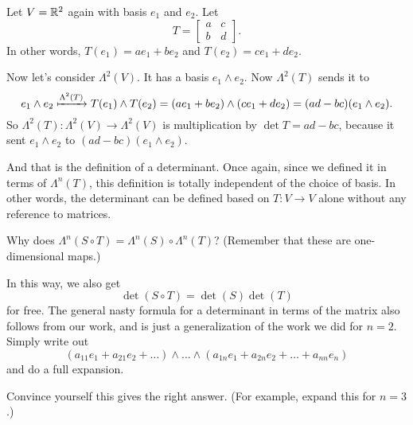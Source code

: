 \begin{example}
	Let $V = \mathbb R^2$ again with basis $e_1$ and $e_2$.
	Let
	\[ T = \begin{bmatrix}
			a & c \\ b & d
		\end{bmatrix}.
	\]
	In other words, $T(e_1) = ae_1 + be_2$ and $T(e_2) = ce_1 + de_2$.

	Now let's consider $\Lambda^2(V)$.
	It has a basis $e_1 \wedge e_2$.
	Now $\Lambda^2(T)$ sends it to
	\[ e_1 \wedge e_2 \xmapsto{\Lambda^2(T)} T(e_1) \wedge T(e_2) =
		(ae_1 + be_2) \wedge (ce_1 + de_2) 
		= (ad-bc)(e_1 \wedge e_2). 
	\]
	So $\Lambda^2(T) : \Lambda^2(V) \to \Lambda^2(V)$
	is multiplication by $\det T = ad-bc$,
	because it sent $e_1 \wedge e_2$ to $(ad-bc)(e_1 \wedge e_2)$.
\end{example}
And that is the definition of a determinant.
Once again, since we defined it in terms of $\Lambda^n(T)$,
this definition is totally independent of the choice of basis.
In other words, the determinant can be defined based on $T : V \to V$ alone
without any reference to matrices.

\begin{ques}
	Why does $\Lambda^n(S \circ T) = \Lambda^n(S) \circ \Lambda^n(T)$?
	(Remember that these are one-dimensional maps.)
\end{ques}
In this way, we also get \[ \det(S \circ T) = \det(S) \det(T) \] for free.
The general nasty formula for a determinant in terms of the matrix also follows from our work,
and is just a generalization of the work we did for $n=2$.
Simply write out
\[ \left( a_{11}e_1 + a_{21}e_2 + \dots \right) \wedge \dots \wedge
	\left( a_{1n}e_1 + a_{2n}e_2 + \dots + a_{nn} e_n \right)
\]
and do a full expansion.
\begin{exercise}
	Convince yourself this gives the right answer.
	(For example, expand this for $n=3$.)
\end{exercise}

